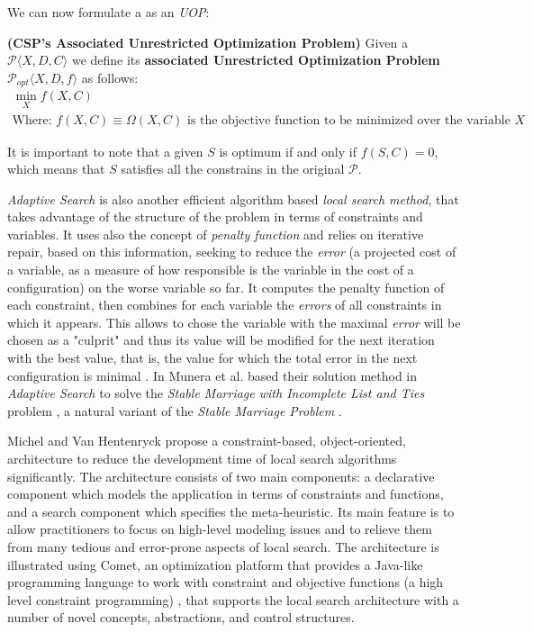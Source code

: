 We can now formulate a \CSP{} as an {\it UOP}:

\begin{definition}{\bf (CSP's Associated Unrestricted Optimization Problem)}
\label{def:ass_CSP}
Given a {\bf \csp} $\mathcal{P}\langle X,D,C \rangle$ we define its {\bf associated Unrestricted Optimization Problem} $\mathcal{P}_{opt}\langle X,D,f \rangle$ as follows: 
\begin{equation*}
\begin{array}{l}
\displaystyle\min_{X} f\left(X,C\right)\\
\text{Where:  } f\left(X,C\right) \equiv \Omega\left(X,C\right) \text{ is the objective function to be minimized over the variable } X
\end{array}
\end{equation*}
\end{definition}

It is important to note that a given $S$ is optimum if and only if $f\left(S,C\right) = 0$, which means that $S$ satisfies all the constrains in the original \csp{} $\mathcal{P}$.

{\it Adaptive Search} is also another efficient algorithm based \textit{local search method}, that takes advantage of the structure of the problem in terms of constraints and variables. It uses also the concept of \textit{penalty function} and relies on iterative repair, based on this information, seeking to reduce the \textit{error} (a projected cost of a variable, as a measure of how responsible is the variable in the cost of a configuration) on the worse variable so far. It computes the penalty function of each constraint, then combines for each variable the \textit{errors} of all constraints in which it appears. This allows to chose the variable with the maximal \textit{error} will be chosen as a "culprit" and thus its value will be modified for the next iteration with the best value, that is, the value for which the total error in the next configuration is minimal \cite{Diaz, Codognet2001, Caniou14}. In \cite{Munera2015} Munera et al. based their solution method in \textit{Adaptive Search} to solve the \textit{Stable Marriage with Incomplete List and Ties} problem \cite{Iwama1999}, a natural variant of the \textit{Stable Marriage Problem} \cite{Gale1962}.

Michel and Van Hentenryck \cite{Michel2002} propose a constraint-based, object-oriented, architecture to reduce the development time of local search algorithms significantly. The architecture consists of two main components: a declarative component which models the application in terms of constraints and functions, and a search component which specifies the meta-heuristic. Its main feature is to allow practitioners to focus on high-level modeling issues and to relieve them from many tedious and error-prone aspects of local search. The architecture is illustrated using {\sc Comet}, an optimization platform that provides a Java-like programming language to work with constraint and objective functions (a high level constraint programming) \cite{Comet, Michel2005}, that supports the local search architecture with a number of novel concepts, abstractions, and control structures.

